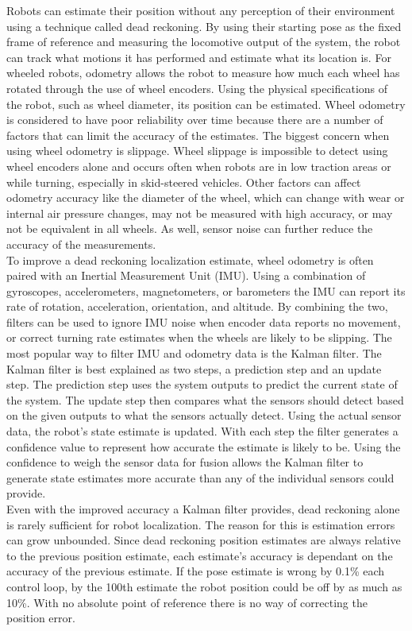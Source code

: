 Robots can estimate their position without any perception of their environment using a technique called dead reckoning. By using their starting pose as the fixed frame of reference and measuring the locomotive output of the system, the robot can track what motions it has performed and estimate what its location is. For wheeled robots, odometry allows the robot to measure how much each wheel has rotated through the use of wheel encoders. Using the physical specifications of the robot, such as wheel diameter, its position can be estimated. Wheel odometry is considered to have poor reliability over time because there are a number of factors that can limit the accuracy of the estimates. The biggest concern when using wheel odometry is slippage. Wheel slippage is impossible to detect using wheel encoders alone and occurs often when robots are in low traction areas or while turning, especially in skid-steered vehicles. Other factors can affect odometry accuracy like the diameter of the wheel, which can change with wear or internal air pressure changes, may not be measured with high accuracy, or may not be equivalent in all wheels. As well, sensor noise can further reduce the accuracy of the measurements.\\

To improve a dead reckoning localization estimate, wheel odometry is often paired with an Inertial Measurement Unit (IMU). Using a combination of gyroscopes, accelerometers, magnetometers, or barometers the IMU can report its rate of rotation, acceleration, orientation, and altitude. By combining the two, filters can be used to ignore IMU noise when encoder data reports no movement, or correct turning rate estimates when the wheels are likely to be slipping. The most popular way to filter IMU and odometry data is the Kalman filter. The Kalman filter is best explained as two steps, a prediction step and an update step. The prediction step uses the system outputs to predict the current state of the system. The update step then compares what the sensors should detect based on the given outputs to what the sensors actually detect. Using the actual sensor data, the robot's state estimate is updated. With each step the filter generates a confidence value to represent how accurate the estimate is likely to be. Using the confidence to weigh the sensor data for fusion allows the Kalman filter to generate state estimates more accurate than any of the individual sensors could provide.\\

Even with the improved accuracy a Kalman filter provides, dead reckoning alone is rarely sufficient for robot localization. The reason for this is estimation errors can grow unbounded. Since dead reckoning position estimates are always relative to the previous position estimate, each estimate's accuracy is dependant on the accuracy of the previous estimate. If the pose estimate is wrong by 0.1\% each control loop, by the 100th estimate the robot position could be off by as much as 10\%. With no absolute point of reference there is no way of correcting the position error.\\

